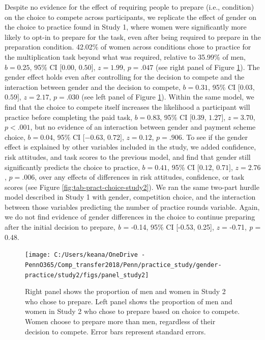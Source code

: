 \documentclass[a4paper, nobind]{templates/ociamthesis}
\begin{document}
Despite no evidence for the effect of requiring people to prepare (i.e., condition) on the choice to compete across participants, we replicate the effect of gender on the choice to practice found in Study 1, where women were significantly more likely to opt-in to prepare for the task, even after being required to prepare in the preparation condition. 42.02\% of women across conditions chose to practice for the multiplication task beyond what was required, relative to 35.99\% of men, \(b = 0.25\), 95\% CI \([0.00\), \(0.50]\), \(z = 1.99\), \(p = .047\) (see right panel of Figure \ref{fig:panel-study2}). The gender effect holds even after controlling for the decision to compete and the interaction between gender and the decision to compete, \(b = 0.31\), 95\% CI \([0.03\), \(0.59]\), \(z = 2.17\), \(p = .030\) (see left panel of Figure \ref{fig:panel-study2}). Within the same model, we find that the choice to compete itself increases the likelihood a participant will practice before completing the paid task, \(b = 0.83\), 95\% CI \([0.39\), \(1.27]\), \(z = 3.70\), \(p < .001\), but no evidence of an interaction between gender and payment scheme choice, \(b = 0.04\), 95\% CI \([-0.63\), \(0.72]\), \(z = 0.12\), \(p = .906\). To see if the gender effect is explained by other variables included in the study, we added confidence, risk attitudes, and task scores to the previous model, and find that gender still significantly predicts the choice to practice, \(b = 0.41\), 95\% CI \([0.12\), \(0.71]\), \(z = 2.76\), \(p = .006\), over any effects of differences in risk attitudes, confidence, or task scores (see Figure \ref{fig:tab-pract-choice-study2}). We ran the same two-part hurdle model described in Study 1 with gender, competition choice, and the interaction between those variables predicting the number of practice rounds variable. Again, we do not find evidence of gender differences in the choice to continue preparing after the initial decision to prepare, \emph{b} = -0.14, 95\% CI {[}-0.53, 0.25{]}, \emph{z} = -0.71, \emph{p} = 0.48.

\begin{figure}

{\centering \texttt{[image: C:/Users/keana/OneDrive - PennO365/Comp\_transfer2018/Penn/practice\_study/gender-practice/study2/figs/panel\_study2]} 

}

\caption{Right panel shows the proportion of men and women in Study 2 who chose to prepare. Left panel shows the proportion of men and women in Study 2 who chose to prepare based on choice to compete. Women choose to prepare more than men, regardless of their decision to compete. Error bars represent standard errors.}\label{fig:panel-study2}
\end{figure}
\end{document}
